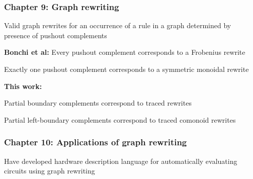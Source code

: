 \begin{frame}
    \frametitle{Chapter 9: Graph rewriting}

    \pause

    Valid graph rewrites for an occurrence of a rule in a graph determined by
    presence of \alert{pushout complements}

    \vspace{1em}

    \pause

    \textbf{Bonchi et al:}
    \alert{Every} pushout complement corresponds to a Frobenius rewrite

    \alert{Exactly one} pushout complement corresponds to a symmetric
    monoidal rewrite

    \vspace{1em}

    \pause

    \textbf{This work:}

    \alert{Partial boundary complements} correspond to \alert{traced}
    rewrites

    \alert{Partial left-boundary complements} correspond to
    \alert{traced comonoid} rewrites

\end{frame}

\begin{frame}
    \frametitle{Chapter 10: Applications of graph rewriting}

    \pause

    Have developed \alert{hardware description language} for
    \alert{automatically} evaluating circuits using graph rewriting

    \pause

    \vspace{0.5em}

    \begin{center}
        

        \vspace{0.5em}

        
    \end{center}
\end{frame}

